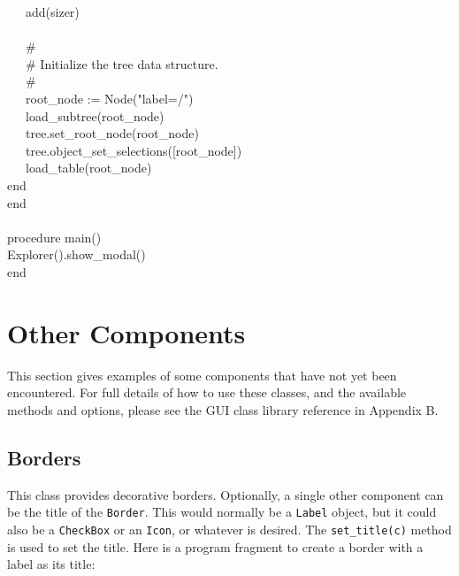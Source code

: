 {\>   \ \ \ add(sizer) \\
\ \\
\>   \ \ \ \# \\
\>   \ \ \ \# Initialize the tree data structure. \\
\>   \ \ \ \# \\
\>   \ \ \ root\_node := Node("label=/") \\
\>   \ \ \ load\_subtree(root\_node) \\
\>   \ \ \ tree.set\_root\_node(root\_node) \\
\>   \ \ \ tree.object\_set\_selections([root\_node]) \\
\>   \ \ \ load\_table(root\_node) \\
\>   end \\
end \\
\ \\
procedure main() \\
\>   Explorer().show\_modal() \\
end
}

\section{Other Components}

This section gives examples of some components that have not yet been
encountered. For full details of how to use these classes, and the
available methods and options, please see the GUI class library
reference in Appendix B.

\subsection{Borders}

This class provides decorative borders. Optionally, a single other
component can be the title of the \texttt{Border}. This would normally
be a \texttt{Label} object, but it could also be a \texttt{CheckBox} or
an \texttt{Icon}, or whatever is desired. The \texttt{set\_title(c)}
method is used to set the title. Here is a program fragment to create a
border with a label as its title:


